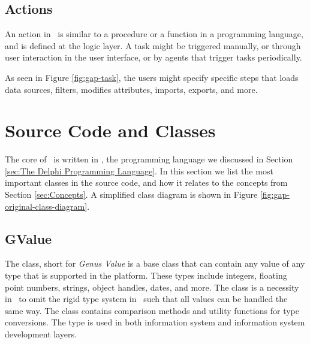 \subsection{Actions}
\label{sub:Actions}
An action in \gap~is similar to a procedure or a function in a programming language, and is defined at the logic layer. A task might be triggered manually, or through user interaction in the user interface, or by agents that trigger tasks periodically.

As seen in Figure \ref{fig:gap-task}, the users might specify specific steps that loads data sources, filters, modifies attributes, imports, exports, and more.


\section{Source Code and Classes}
\label{sec:Source Code and Classes}
The core of \gap~is written in \delphi, the programming language we discussed in Section \ref{sec:The Delphi Programming Language}. In this section we list the most important classes in the source code, and how it relates to the concepts from Section \ref{sec:Concepts}. A simplified class diagram is shown in Figure \ref{fig:gap-original-class-diagram}.

\subsection{GValue}
\label{sub:GValue}
The  class, short for \textit{Genus Value} is a base class that can contain any value of any type that is supported in the platform. These types include integers, floating point numbers, strings, object handles, dates, and more. The  class is a necessity in \gap~to omit the rigid type system in \delphi~such that all values can be handled the same way. The class contains comparison methods and utility functions for type conversions. The  type is used in both information system and information system development layers.

